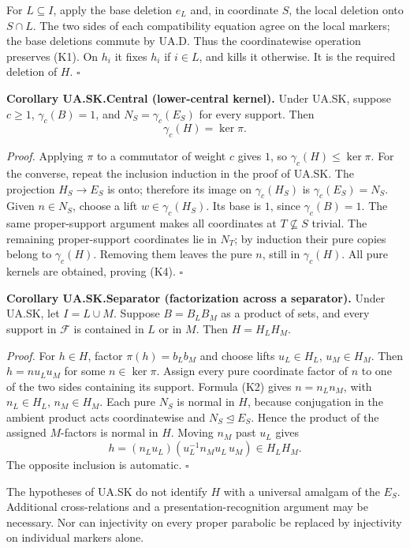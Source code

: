 For \(L\subseteq I\), apply the base deletion \(e_L\) and, in coordinate
\(S\), the local deletion onto \(S\cap L\). The two sides of each
compatibility equation agree on the local markers; the base deletions
commute by UA.D. Thus the coordinatewise operation preserves (K1). On
\(h_i\) it fixes \(h_i\) if \(i\in L\), and kills it otherwise. It is
the required deletion of \(H\). \(\square\)

\textbf{Corollary UA.SK.Central (lower-central kernel).} Under UA.SK,
suppose \(c\geq1\), \(\gamma_c(B)=1\), and \(N_S=\gamma_c(E_S)\) for
every support. Then \[
\gamma_c(H)=\ker\pi.
\tag{K4}
\]

\emph{Proof.} Applying \(\pi\) to a commutator of weight \(c\) gives
\(1\), so \(\gamma_c(H)\leq\ker\pi\). For the converse, repeat the
inclusion induction in the proof of UA.SK. The projection \(H_S\to E_S\)
is onto; therefore its image on \(\gamma_c(H_S)\) is
\(\gamma_c(E_S)=N_S\). Given \(n\in N_S\), choose a lift
\(w\in\gamma_c(H_S)\). Its base is \(1\), since \(\gamma_c(B)=1\). The
same proper-support argument makes all coordinates at
\(T\not\subseteq S\) trivial. The remaining proper-support coordinates
lie in \(N_T\); by induction their pure copies belong to
\(\gamma_c(H)\). Removing them leaves the pure \(n\), still in
\(\gamma_c(H)\). All pure kernels are obtained, proving (K4).
\(\square\)

\textbf{Corollary UA.SK.Separator (factorization across a separator).}
Under UA.SK, let \(I=L\cup M\). Suppose \(B=B_LB_M\) as a product of
sets, and every support in \(\mathcal F\) is contained in \(L\) or in
\(M\). Then \(H=H_LH_M\).

\emph{Proof.} For \(h\in H\), factor \(\pi(h)=b_Lb_M\) and choose lifts
\(u_L\in H_L\), \(u_M\in H_M\). Then \(h=n u_Lu_M\) for some
\(n\in\ker\pi\). Assign every pure coordinate factor of \(n\) to one of
the two sides containing its support. Formula (K2) gives \(n=n_Ln_M\),
with \(n_L\in H_L\), \(n_M\in H_M\). Each pure \(N_S\) is normal in
\(H\), because conjugation in the ambient product acts coordinatewise
and \(N_S\unlhd E_S\). Hence the product of the assigned \(M\)-factors
is normal in \(H\). Moving \(n_M\) past \(u_L\) gives \[
h=(n_Lu_L)(u_L^{-1}n_Mu_L\,u_M)\in H_LH_M.
\] The opposite inclusion is automatic. \(\square\)

The hypotheses of UA.SK do not identify \(H\) with a universal amalgam
of the \(E_S\). Additional cross-relations and a
presentation-recognition argument may be necessary. Nor can injectivity
on every proper parabolic be replaced by injectivity on individual
markers alone.

